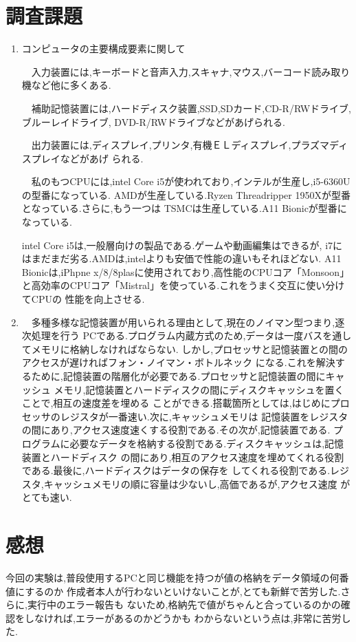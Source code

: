 \documentclass[a4paper,11pt,titlepage]{jarticle}
\begin{document}
 \section{調査課題}
 \begin{enumerate}
  \item コンピュータの主要構成要素に関して
  \par
    　入力装置には,キーボードと音声入力,スキャナ,マウス,バーコード読み取り機など他に多くある.\par
    　補助記憶装置には,ハードディスク装置,SSD,SDカード,CD-R/RWドライブ,ブルーレイドライブ,
    DVD-R/RWドライブなどがあげられる.\par
    　出力装置には,ディスプレイ,プリンタ,有機ＥＬディスプレイ,プラズマディスプレイなどがあげ
    られる.\par
    　私のもつCPUには,intel Core i5が使われており,インテルが生産し,i5-6360Uの型番になっている.
    AMDが生産している.Ryzen Threadripper 1950Xが型番となっている.さらに,もう一つは
    TSMCは生産している.A11 Bionicが型番になっている.\par
      intel Core i5は,一般層向けの製品である.ゲームや動画編集はできるが,
    i7にはまだまだ劣る.AMDは,intelよりも安価で性能の違いもそれほどない.
    A11 Bionicは,iPhpne x/8/8plasに使用されており,高性能のCPUコア「Monsoon」
    と高効率のCPUコア「Mistral」を使っている.これをうまく交互に使い分けてCPUの
    性能を向上させる.
  \item
    　多種多様な記憶装置が用いられる理由として,現在のノイマン型つまり,逐次処理を行う
    PCである.プログラム内蔵方式のため,データは一度バスを通してメモリに格納しなければならない.
    しかし,プロセッサと記憶装置との間のアクセスが遅ければフォン・ノイマン・ボトルネック
    になる.これを解決するために,記憶装置の階層化が必要である.プロセッサと記憶装置の間にキャッシュ
    メモリ,記憶装置とハードディスクの間にディスクキャッシュを置くことで,相互の速度差を埋める
    ことができる.搭載箇所としては,はじめにプロセッサのレジスタが一番速い.次に,キャッシュメモリは
    記憶装置をレジスタの間にあり,アクセス速度速くする役割である.その次が,記憶装置である.
    プログラムに必要なデータを格納する役割である.ディスクキャッシュは,記憶装置とハードディスク
    の間にあり,相互のアクセス速度を埋めてくれる役割である.最後に,ハードディスクはデータの保存を
    してくれる役割である.レジスタ,キャッシュメモリの順に容量は少ないし,高価であるが,アクセス速度
    がとても速い.
 \end{enumerate}
 \section{感想}
  今回の実験は,普段使用するPCと同じ機能を持つが値の格納をデータ領域の何番値にするのか
  作成者本人が行わないといけないことが,とても新鮮で苦労した.さらに,実行中のエラー報告も
  ないため,格納先で値がちゃんと合っているのかの確認をしなければ,エラーがあるのかどうかも
  わからないという点は,非常に苦労した.
\end{document}
